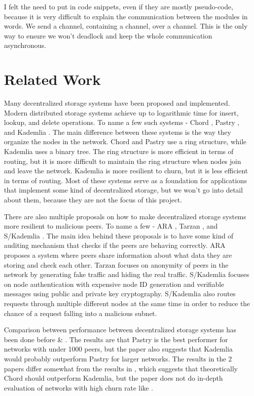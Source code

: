 \documentclass[ twoside,openright,titlepage,numbers=noenddot,headinclude,%
                footinclude=true,cleardoublepage=empty,abstractoff, %
                BCOR=5mm,paper=a4,fontsize=11pt,%
                ngerman,american,%
                ]{scrreprt}
\begin{document}
I felt the need to put in code snippets, even if they are mostly pseudo-code,
because it is very difficult to explain the communication between the modules in words.
We send a channel, containing a channel, over a channel.
This is the only way to ensure we won't deadlock and keep the whole communication asynchronous.


\chapter{Related Work}
\label{cha:related-work}

Many decentralized storage systems have been proposed and implemented.
Modern distributed storage systems achieve up to logarithmic time for insert, lookup, and delete operations.
To name a few such systems - Chord \cite{chord}, Pastry \cite{pastry}, and Kademlia \cite{kademlia}.
The main difference between these systems is the way they organize the nodes in the network.
Chord and Pastry use a ring structure, while Kademlia uses a binary tree.
The ring structure is more efficient in terms of routing, but it is more difficult to maintain the ring structure
when nodes join and leave the network.
Kademlia is more resilient to churn, but it is less efficient in terms of routing.
Most of these systems serve as a foundation for applications that implement some kind of decentralized storage,
but we won't go into detail about them, because they are not the focus of this project.

There are also multiple proposals on how to make decentralized storage systems more resilient to malicious peers.
To name a few - ARA \cite{ara}, Tarzan \cite{tarzan}, and S/Kademlia \cite{skademlia}.
The main idea behind these proposals is to have some kind of auditing mechanism that checks if the peers are behaving correctly.
ARA proposes a system where peers share information about what data they are storing and check each other.
Tarzan focuses on anonymity of peers in the network by generating fake traffic and hiding the real traffic.
S/Kademlia focuses on node authentication with expensive node ID generation and verifiable messages using
public and private key cryptography.
S/Kademlia also routes requests through multiple different nodes at the same time
in order to reduce the chance of a request falling into a malicious subnet.

Comparison between performance between decentralized storage systems has been done before
\cite{kadvschordvspastry} \& \cite{2019AIPC.2129b0131A}.
The results are that Pastry is the best performer for networks with under 1000 peers, but the paper also suggests
that Kademlia would probably outperform Pastry for larger networks.
The results in the 2 papers differ somewhat from the results in \cite{compstudy}, which suggests that theoretically
Chord should outperform Kademlia, but the paper does not do in-depth evaluation of networks with high churn rate
like \cite{kadvschordvspastry}.
\end{document}
